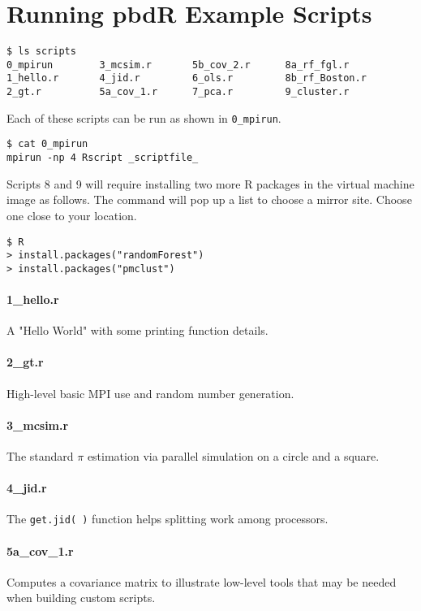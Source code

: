 \documentclass{article}
\begin{document}
\section{Running pbdR Example Scripts}
\begin{verbatim}
$ ls scripts
0_mpirun        3_mcsim.r       5b_cov_2.r      8a_rf_fgl.r
1_hello.r       4_jid.r         6_ols.r         8b_rf_Boston.r
2_gt.r          5a_cov_1.r      7_pca.r         9_cluster.r
\end{verbatim}
Each of these scripts can be run as shown in {\tt 0\_mpirun}.
\begin{verbatim}
$ cat 0_mpirun
mpirun -np 4 Rscript _scriptfile_
\end{verbatim}
Scripts 8 and 9 will require installing two more R packages in the
virtual machine image as follows. The command will pop up a list to
choose a mirror site. Choose one close to your location.
\begin{verbatim}
$ R
> install.packages("randomForest")
> install.packages("pmclust")
\end{verbatim}

\paragraph{1\_hello.r} A "Hello World" with some printing function
details.

\paragraph{2\_gt.r} High-level basic MPI use and random number
generation.

\paragraph{3\_mcsim.r} The standard $\pi$ estimation via parallel
simulation on a circle and a square.

\paragraph{4\_jid.r} The {\tt get.jid( )} function helps splitting
work among processors.

\paragraph{5a\_cov\_1.r} Computes a covariance matrix to illustrate
low-level tools that may be needed when building custom scripts.
\end{document}
